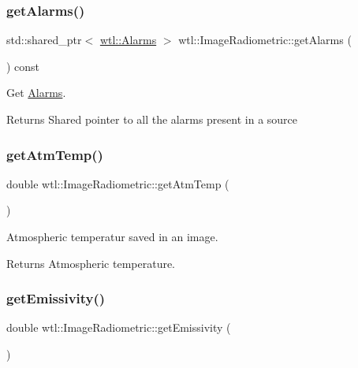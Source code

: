 \subsubsection{\texorpdfstring{get\+Alarms()}{getAlarms()}}
{\footnotesize\ttfamily std\+::shared\+\_\+ptr$<$ \hyperlink{classwtl_1_1_alarms}{wtl\+::\+Alarms} $>$ wtl\+::\+Image\+Radiometric\+::get\+Alarms (\begin{DoxyParamCaption}{ }\end{DoxyParamCaption}) const}



Get \hyperlink{classwtl_1_1_alarms}{Alarms}. 

\begin{DoxyReturn}{Returns}
Shared pointer to all the alarms present in a source 
\end{DoxyReturn}
\mbox{\label{classwtl_1_1_image_radiometric_a4a41b730ce5d5dc31bf6f008398d0058}} 
\subsubsection{\texorpdfstring{get\+Atm\+Temp()}{getAtmTemp()}}
{\footnotesize\ttfamily double wtl\+::\+Image\+Radiometric\+::get\+Atm\+Temp (\begin{DoxyParamCaption}{ }\end{DoxyParamCaption})}



Atmospheric temperatur saved in an image. 

\begin{DoxyReturn}{Returns}
Atmospheric temperature. 
\end{DoxyReturn}
\mbox{\label{classwtl_1_1_image_radiometric_a061574091d97bb6b9b2509d3c1dd592b}} 
\subsubsection{\texorpdfstring{get\+Emissivity()}{getEmissivity()}}
{\footnotesize\ttfamily double wtl\+::\+Image\+Radiometric\+::get\+Emissivity (\begin{DoxyParamCaption}{ }\end{DoxyParamCaption})}



